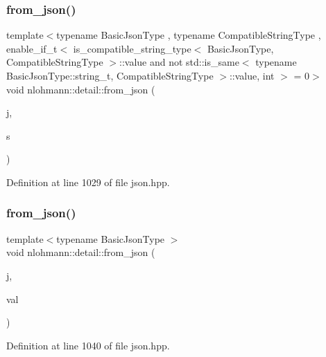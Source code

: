 \subsubsection{\texorpdfstring{from\+\_\+json()}{from\_json()}\hspace{0.1cm}{\footnotesize\ttfamily [4/18]}}
{\footnotesize\ttfamily template$<$typename Basic\+Json\+Type , typename Compatible\+String\+Type , enable\+\_\+if\+\_\+t$<$ is\+\_\+compatible\+\_\+string\+\_\+type$<$ Basic\+Json\+Type, Compatible\+String\+Type $>$\+::value and not std\+::is\+\_\+same$<$ typename Basic\+Json\+Type\+::string\+\_\+t, Compatible\+String\+Type $>$\+::value, int $>$  = 0$>$ \\
void nlohmann\+::detail\+::from\+\_\+json (\begin{DoxyParamCaption}\item[{const Basic\+Json\+Type \&}]{j,  }\item[{Compatible\+String\+Type \&}]{s }\end{DoxyParamCaption})}



Definition at line 1029 of file json.\+hpp.

\mbox{\label{namespacenlohmann_1_1detail_a7cb5dd7d46a60e65f9a8e0873b3f7dd8}} 
\subsubsection{\texorpdfstring{from\+\_\+json()}{from\_json()}\hspace{0.1cm}{\footnotesize\ttfamily [5/18]}}
{\footnotesize\ttfamily template$<$typename Basic\+Json\+Type $>$ \\
void nlohmann\+::detail\+::from\+\_\+json (\begin{DoxyParamCaption}\item[{const Basic\+Json\+Type \&}]{j,  }\item[{typename Basic\+Json\+Type\+::number\+\_\+float\+\_\+t \&}]{val }\end{DoxyParamCaption})}



Definition at line 1040 of file json.\+hpp.

\mbox{\label{namespacenlohmann_1_1detail_ace4d5680ba413d9fd897ccb5d9c61a1c}} 
